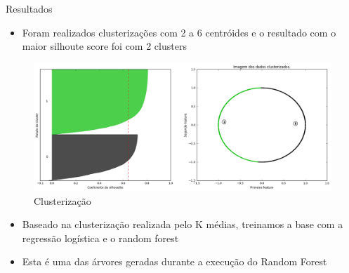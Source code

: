 \documentclass[final,hyperref={pdfpagelabels=false, brazil}]{beamer}
\begin{document}
\begin{frame}[t]
\begin{columns}[t]
\begin{column}{.465\textwidth}
     


\begin{block}{Resultados}

\begin{itemize}
\item Foram realizados clusterizações com 2 a 6 centróides e o resultado com o maior silhoute score foi com 2 clusters
\end{itemize}

\begin{figure}
\includegraphics[width=0.85\linewidth]{silhoute2.png}
\caption{Clusterização}
\end{figure}

\begin{itemize}
\item Baseado na clusterização realizada pelo K médias, treinamos a base com a regressão logística e o random forest

\item Esta é uma das árvores geradas durante a execução do Random Forest


\end{itemize}
\end{block}
\end{column}
\end{columns}
\end{frame}
\end{document}
